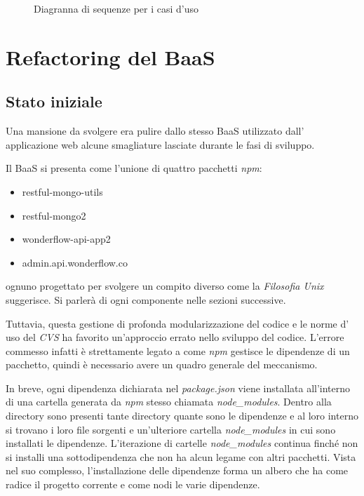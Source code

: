 \begin{figure}[H]
\centering
{}
\hfill
{}
\hfill
{}
\hfill
{}
\hfill
{}
\caption{Diagranna di sequenze per i casi d'uso}
\label{fig:uc_user}
\end{figure}

\newpage

\section{Refactoring del BaaS}
\subsection{Stato iniziale}
Una mansione da svolgere era pulire dallo stesso \gls{BaaS} utilizzato dall'
applicazione web alcune smagliature lasciate durante le fasi di sviluppo.

Il \gls{BaaS} si presenta come l'unione di quattro pacchetti \textit{npm}:
\begin{itemize}
\item restful-mongo-utils
\item restful-mongo2
\item wonderflow-api-app2
\item admin.api.wonderflow.co
\end{itemize}
ognuno progettato per svolgere un compito diverso come la \textit{Filosofia
Unix} suggerisce. Si parlerà di ogni componente nelle sezioni successive.

Tuttavia, questa gestione di profonda modularizzazione del codice e le norme d'
uso del \textit{CVS} ha favorito un'approccio errato nello sviluppo del codice.
L'errore commesso infatti è strettamente legato a come \textit{npm} gestisce le
dipendenze di un pacchetto, quindi è necessario avere un quadro generale del
meccanismo.

In breve, ogni dipendenza dichiarata nel \textit{package.json} viene installata
all'interno di una cartella generata da \textit{npm} stesso chiamata
\textit{node\_modules}. Dentro alla directory sono presenti tante directory
quante sono le dipendenze e al loro interno si trovano i loro file sorgenti e
un'ulteriore cartella \textit{node\_modules} in cui sono installati le
dipendenze. L'iterazione di cartelle \textit{node\_modules} continua finché non
si installi una sottodipendenza che non ha alcun legame con altri pacchetti.
Vista nel suo complesso, l'installazione delle dipendenze forma un albero che ha
come radice il progetto corrente e come nodi le varie dipendenze.

